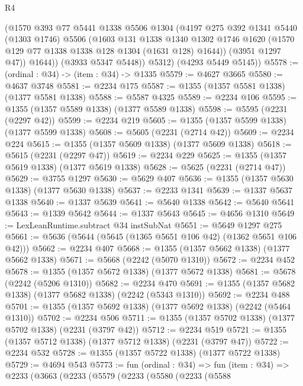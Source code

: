 \begin{lexlean}{R4}
\begin{coremodule}
            (@1570
              @393
              @77
              @5441
              @1338
              @5506
              @1304
              (@4197
                @275
                @392
                @1341
                @5440
                (@1303 @1746)
                @5506
                (@1603
                  @131
                  @1338
                  @1340
                  @1302
                  @1746
                  @1620
                  (@1570 @129 @77 @1338 @1338 @128 @1304 (@1631 @128) @1644))
                (@3951 @1297 @47))
              @1644))
          (@3933 @5347 @5448))
        @5312)
      (@4293 @5449 @5145))
@5578 := (ordinal : @34) -> (item : @34) -> @1335
@5579 := @4627 @3665
@5580 := @4637 @3748
@5581 := @2234 @175
@5587 := @1355 (@1357 @5581 @1338) (@1377 @5581 @1338)
@5588 := @5587 @4325
@5589 := @2234 @106
@5595 := @1355 (@1357 @5589 @1338) (@1377 @5589 @1338)
@5598 := @5595 (@2231 (@2297 @42))
@5599 := @2234 @219
@5605 := @1355 (@1357 @5599 @1338) (@1377 @5599 @1338)
@5608 := @5605 (@2231 (@2714 @42))
@5609 := @2234 @224
@5615 := @1355 (@1357 @5609 @1338) (@1377 @5609 @1338)
@5618 := @5615 (@2231 (@2297 @47))
@5619 := @2234 @229
@5625 := @1355 (@1357 @5619 @1338) (@1377 @5619 @1338)
@5628 := @5625 (@2231 (@2714 @47))
@5629 := @3755 @1297
@5630 := @5629 @407
@5636 := @1355 (@1357 @5630 @1338) (@1377 @5630 @1338)
@5637 := @2233 @1341
@5639 := @1337 @5637 @1338
@5640 := @1337 @5639
@5641 := @5640 @1338
@5642 := @5640 @5641
@5643 := @1339 @5642
@5644 := @1337 @5643
@5645 := @4656 @1310
@5649 := LexLeanRuntime.subtract @34 instSubNat
@5651 := @5649 @1297 @275
@5661 := @5636 (@5644 (@5645 (@1365 @5651 @106 @42) (@1362 @5651 @106 @42)))
@5662 := @2234 @407
@5668 := @1355 (@1357 @5662 @1338) (@1377 @5662 @1338)
@5671 := @5668 (@2242 (@5070 @1310))
@5672 := @2234 @452
@5678 := @1355 (@1357 @5672 @1338) (@1377 @5672 @1338)
@5681 := @5678 (@2242 (@5206 @1310))
@5682 := @2234 @470
@5691 := @1355 (@1357 @5682 @1338) (@1377 @5682 @1338) (@2242 (@5343 @1310))
@5692 := @2234 @488
@5701 := @1355 (@1357 @5692 @1338) (@1377 @5692 @1338) (@2242 (@5464 @1310))
@5702 := @2234 @506
@5711 := @1355 (@1357 @5702 @1338) (@1377 @5702 @1338) (@2231 (@3797 @42))
@5712 := @2234 @519
@5721 := @1355 (@1357 @5712 @1338) (@1377 @5712 @1338) (@2231 (@3797 @47))
@5722 := @2234 @532
@5728 := @1355 (@1357 @5722 @1338) (@1377 @5722 @1338)
@5729 := @4694 @543
@5773 := fun (ordinal : @34) =>
  fun (item : @34) =>
  @2233
    (@3663
      (@2233
        (@5579
          (@2233
            (@5580
              (@2233
                (@5588

\end{coremodule}
\end{lexlean}
